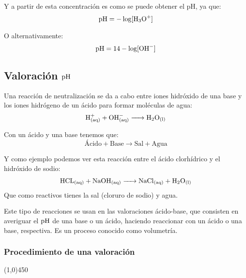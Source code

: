 \documentclass[arial,a4paper,print]{article}
\begin{document}
Y a partir de esta concentración es como se puede obtener el pH, ya que:
\begin{equation*}
	\ce{pH} = -\log[\ce{H3O^+}]
\end{equation*}

O alternativamente:
\begin{equation*}
	\ce{pH} = 14 - \log[\ce{OH^-}]
\end{equation*}

\pagebreak

\subsection{Valoración $\ce{pH}$}
Una reacción de neutralización se da a cabo entre iones hidróxido de una base y los iones hidrógeno de un ácido para formar moléculas de agua:
\begin{equation*}
	\ce{H^+_{(aq)} + OH^-_{(aq)} -> H2O_{(l)}}
\end{equation*}

Con un ácido y una base tenemos que:
\begin{equation*}
	\text{Ácido} + \text{Base} \rightarrow \text{Sal} + \text{Agua}
\end{equation*}

Y como ejemplo podemos ver esta reacción entre el ácido clorhídrico y el hidróxido de sodio:
\begin{equation*}
	\ce{HCL_{(aq)} + NaOH_{(aq)} -> NaCl_{(aq)} + H2O_{(l)}}
\end{equation*}
Que como reactivos tienes la sal (cloruro de sodio) y agua. 

Este tipo de reacciones se usan en las valoraciones ácido-base, que consisten en averiguar el $\ce{pH}$ de una base o un ácido, haciendo reaccionar con un ácido o una base, respectiva. Es un proceso conocido como volumetría. 

\subsubsection{Procedimiento de una valoración}
\line(1,0){450}
\end{document}
